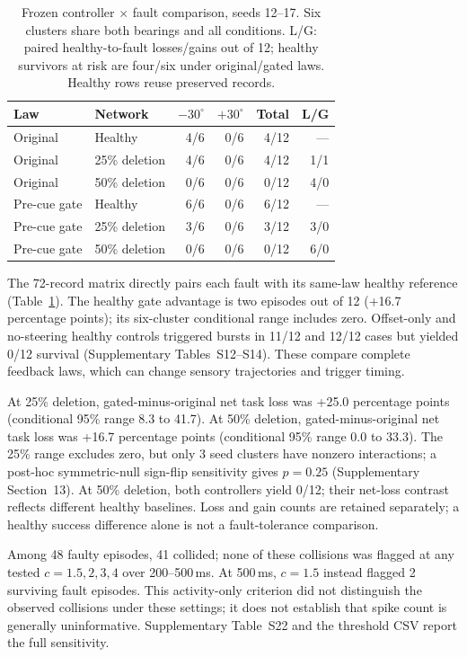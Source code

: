 \begin{table}[t]
\caption{Frozen controller $\times$ fault comparison, seeds 12--17. Six clusters share both bearings and all conditions. L/G: paired healthy-to-fault losses/gains out of 12; healthy survivors at risk are four/six under original/gated laws. Healthy rows reuse preserved records.}
\label{tab:steering}
\centering\small
\setlength{\tabcolsep}{3pt}
\begin{tabular}{llrrrr}
\toprule
Law & Network & $-30^\circ$ & $+30^\circ$ & Total & L/G\\
\midrule
Original & Healthy & 4/6 & 0/6 & 4/12 & ---\\
Original & 25\% deletion & 4/6 & 0/6 & 4/12 & 1/1\\
Original & 50\% deletion & 0/6 & 0/6 & 0/12 & 4/0\\
Pre-cue gate & Healthy & 6/6 & 0/6 & 6/12 & ---\\
Pre-cue gate & 25\% deletion & 3/6 & 0/6 & 3/12 & 3/0\\
Pre-cue gate & 50\% deletion & 0/6 & 0/6 & 0/12 & 6/0\\
\bottomrule\end{tabular}\end{table}

The 72-record matrix directly pairs each fault with its
same-law healthy reference (Table~\ref{tab:steering}). The healthy gate advantage
is two episodes out of 12 (+16.7 percentage points); its six-cluster conditional
range includes zero. Offset-only and no-steering healthy controls triggered
bursts in 11/12 and 12/12 cases but yielded 0/12 survival (Supplementary
Tables~S12--S14). These compare complete feedback laws, which can change sensory
trajectories and trigger timing.

At 25\% deletion, gated-minus-original net task loss was +25.0 percentage points (conditional 95\% range 8.3 to 41.7). At 50\% deletion, gated-minus-original net task loss was +16.7 percentage points (conditional 95\% range 0.0 to 33.3). The 25\% range excludes zero, but only 3 seed clusters have nonzero interactions; a post-hoc symmetric-null sign-flip sensitivity gives $p=0.25$ (Supplementary Section~13). At 50\% deletion, both controllers yield 0/12; their net-loss contrast reflects different healthy baselines. Loss and gain counts are retained separately; a healthy success difference alone is not a fault-tolerance comparison.

Among 48 faulty episodes, 41 collided; none of these collisions was flagged at any tested $c=1.5,2,3,4$ over 200--500\,ms. At 500\,ms, $c=1.5$ instead flagged 2 surviving fault episodes. This activity-only criterion did not distinguish the observed collisions under these settings; it does not establish that spike count is generally uninformative. Supplementary Table~S22 and the threshold CSV report the full sensitivity.

